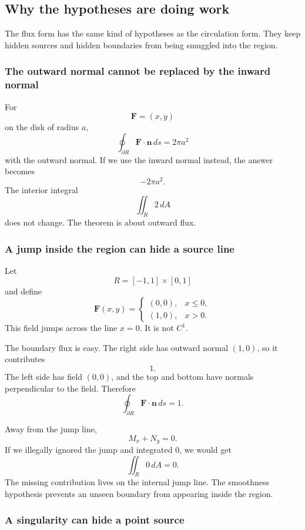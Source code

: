 \subsection{Why the hypotheses are doing work}

The flux form has the same kind of hypotheses as the circulation form.  They keep
hidden sources and hidden boundaries from being smuggled into the region.

\subsubsection*{The outward normal cannot be replaced by the inward normal}

For
\[
    \mathbf F=(x,y)
\]
on the disk of radius \(a\),
\[
    \oint_{\partial R}\mathbf F\cdot\mathbf n\,ds=2\pi a^2
\]
with the outward normal.  If we use the inward normal instead, the answer becomes
\[
    -2\pi a^2.
\]
The interior integral
\[
    \iint_R 2\,dA
\]
does not change.  The theorem is about outward flux.

\subsubsection*{A jump inside the region can hide a source line}

Let
\[
    R=[-1,1]\times[0,1]
\]
and define
\[
    \mathbf F(x,y)=
    \begin{cases}
    (0,0), & x\le0,\\
    (1,0), & x>0.
    \end{cases}
\]
This field jumps across the line \(x=0\).  It is not \(C^1\).

The boundary flux is easy.  The right side has outward normal \((1,0)\), so it
contributes
\[
    1.
\]
The left side has field \((0,0)\), and the top and bottom have normals perpendicular
to the field.  Therefore
\[
\boxed{
    \oint_{\partial R}\mathbf F\cdot\mathbf n\,ds=1.
}
\]

Away from the jump line,
\[
    M_x+N_y=0.
\]
If we illegally ignored the jump and integrated \(0\), we would get
\[
    \iint_R 0\,dA=0.
\]
The missing contribution lives on the internal jump line.  The smoothness hypothesis
prevents an unseen boundary from appearing inside the region.

\subsubsection*{A singularity can hide a point source}

